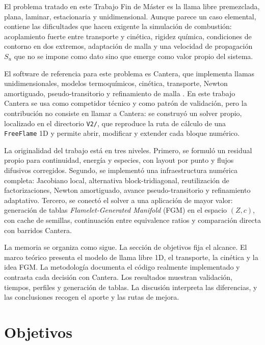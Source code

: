 \documentclass[12pt,a4paper]{article}
\begin{document}
El problema tratado en este Trabajo Fin de Máster es la llama libre premezclada, plana, laminar, estacionaria y unidimensional. Aunque parece un caso elemental, contiene las dificultades que hacen exigente la simulación de combustión: acoplamiento fuerte entre transporte y cinética, rigidez química, condiciones de contorno en dos extremos, adaptación de malla y una velocidad de propagación $S_u$ que no se impone como dato sino que emerge como valor propio del sistema.

El software de referencia para este problema es Cantera, que implementa llamas unidimensionales, modelos termoquímicos, cinética, transporte, Newton amortiguado, pseudo-transitorio y refinamiento de malla \cite{Cantera2023,CanteraDocs31}. En este trabajo Cantera se usa como competidor técnico y como patrón de validación, pero la contribución no consiste en llamar a Cantera: se construyó un solver propio, localizado en el directorio \texttt{V2/}, que reproduce la ruta de cálculo de una \texttt{FreeFlame} 1D y permite abrir, modificar y extender cada bloque numérico.

La originalidad del trabajo está en tres niveles. Primero, se formuló un residual propio para continuidad, energía y especies, con layout por punto y flujos difusivos corregidos. Segundo, se implementó una infraestructura numérica completa: Jacobiano local, alternativa block-tridiagonal, reutilización de factorizaciones, Newton amortiguado, avance pseudo-transitorio y refinamiento adaptativo. Tercero, se conectó el solver a una aplicación de mayor valor: generación de tablas \textit{Flamelet-Generated Manifold} (FGM) en el espacio $(Z,c)$, con cache de semillas, continuación entre equivalence ratios y comparación directa con barridos Cantera.

La memoria se organiza como sigue. La sección de objetivos fija el alcance. El marco teórico presenta el modelo de llama libre 1D, el transporte, la cinética y la idea FGM. La metodología documenta el código realmente implementado y contrasta cada decisión con Cantera. Los resultados muestran validación, tiempos, perfiles y generación de tablas. La discusión interpreta las diferencias, y las conclusiones recogen el aporte y las rutas de mejora.

\section{Objetivos}
\end{document}
